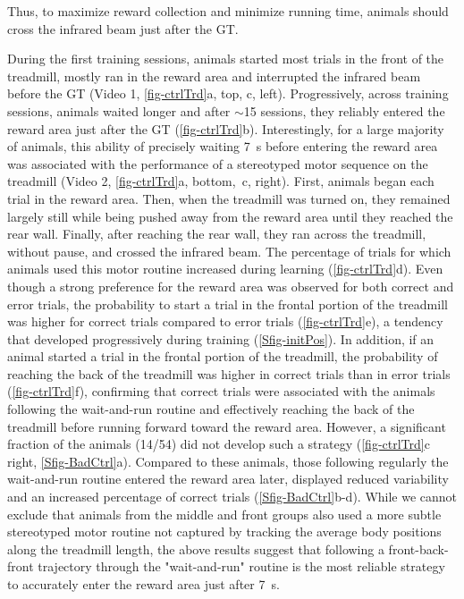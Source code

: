 Thus, to maximize reward collection and minimize running time, animals should cross the infrared beam just after the GT.
\par

During the first training sessions, animals started most trials in the front of the treadmill, mostly ran in the reward area and interrupted the infrared beam before the GT (Video 1, \autoref{fig-ctrlTrd}a, top, c, left).
Progressively, across training sessions, animals waited longer and after $\sim$15 sessions, they reliably entered the reward area just after the GT (\autoref{fig-ctrlTrd}b).
Interestingly, for a large majority of animals, this ability of precisely waiting 7~s before entering the reward area was associated with the performance of a stereotyped motor sequence on the treadmill (Video 2, \autoref{fig-ctrlTrd}a, bottom,~c, right).
First, animals began each trial in the reward area.
Then, when the treadmill was turned on, they remained largely still while being pushed away from the reward area until they reached the rear wall.
Finally, after reaching the rear wall, they ran across the treadmill, without pause, and crossed the infrared beam.
The percentage of trials for which animals used this motor routine increased during learning (\autoref{fig-ctrlTrd}d). 
Even though a strong preference for the reward area was observed for both correct and error trials, the probability to start a trial in the frontal portion of the treadmill was higher for correct trials compared to error trials (\autoref{fig-ctrlTrd}e), a tendency that developed progressively during training (\autoref{Sfig-initPos}).
In addition, if an animal started a trial in the frontal portion of the treadmill, the probability of reaching the back of the treadmill was higher in correct trials than in error trials (\autoref{fig-ctrlTrd}f), confirming that correct trials were associated with the animals following the wait-and-run routine and effectively reaching the back of the treadmill before running forward toward the reward area.
However, a significant fraction of the animals (14/54) did not develop such a strategy (\autoref{fig-ctrlTrd}c right, \autoref{Sfig-BadCtrl}a).
Compared to these animals, those following regularly the wait-and-run routine entered the reward area later, displayed reduced variability and an increased percentage of correct trials (\autoref{Sfig-BadCtrl}b-d).
While we cannot exclude that animals from the middle and front groups also used a more subtle stereotyped motor routine not captured by tracking the average body positions along the treadmill length, the above results suggest that following a front-back-front trajectory through the "wait-and-run" routine is the most reliable strategy to accurately enter the reward area just after 7~s.
